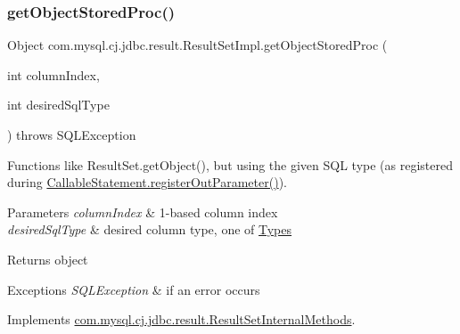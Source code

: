 \subsubsection{\texorpdfstring{get\+Object\+Stored\+Proc()}{getObjectStoredProc()}\hspace{0.1cm}{\footnotesize\ttfamily [1/4]}}
{\footnotesize\ttfamily Object com.\+mysql.\+cj.\+jdbc.\+result.\+Result\+Set\+Impl.\+get\+Object\+Stored\+Proc (\begin{DoxyParamCaption}\item[{int}]{column\+Index,  }\item[{int}]{desired\+Sql\+Type }\end{DoxyParamCaption}) throws S\+Q\+L\+Exception}

Functions like Result\+Set.\+get\+Object(), but using the given S\+QL type (as registered during \mbox{\hyperlink{classcom_1_1mysql_1_1cj_1_1jdbc_1_1_callable_statement_affc71b6220a237feb94f842a2347d1da}{Callable\+Statement.\+register\+Out\+Parameter()}}).


\begin{DoxyParams}{Parameters}
{\em column\+Index} & 1-\/based column index \\
\hline
{\em desired\+Sql\+Type} & desired column type, one of \mbox{\hyperlink{}{Types}} \\
\hline
\end{DoxyParams}
\begin{DoxyReturn}{Returns}
object 
\end{DoxyReturn}

\begin{DoxyExceptions}{Exceptions}
{\em S\+Q\+L\+Exception} & if an error occurs \\
\hline
\end{DoxyExceptions}


Implements \mbox{\hyperlink{interfacecom_1_1mysql_1_1cj_1_1jdbc_1_1result_1_1_result_set_internal_methods_a2a06ef27f3e32523ff5d6b8e04f7586b}{com.\+mysql.\+cj.\+jdbc.\+result.\+Result\+Set\+Internal\+Methods}}.

\mbox{\label{classcom_1_1mysql_1_1cj_1_1jdbc_1_1result_1_1_result_set_impl_a70dfce90a5b666ec4699ca1b91a7a713}} 
